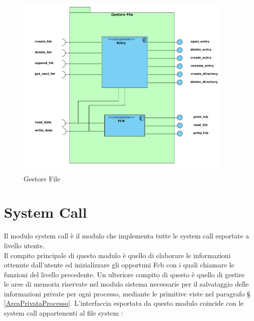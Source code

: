  \newpage

  \begin{figure}[h]
 \centering
 \includegraphics[width=400px,height=350px]{./Immagini/GestoreFile.png}
 \caption{Gestore File}
 \label{fig:GestoreFile}
\end{figure}


\section{System Call}
\label{sec:Logico} 
   Il modulo system call è il modulo che implementa tutte le system call esportate a livello utente. \\		
   Il compito principale di questo modulo è quello di elaborare le informazioni ottenute dall'utente ed inizializzare gli opportuni Fcb con i quali chiamare le funzioni del livello precedente. 
   Un ulteriore compito di questo è quello di gestire le aree di memoria riservate nel modulo sistema necessarie per il salvataggio delle informazioni private per ogni processo, mediante le primitive viste nel paragrafo § \ref{AreaPrivataProcesso}.\newpage
   L'interfaccia esportata da questo modulo coincide con le system call appartenenti al file system : \\
          
